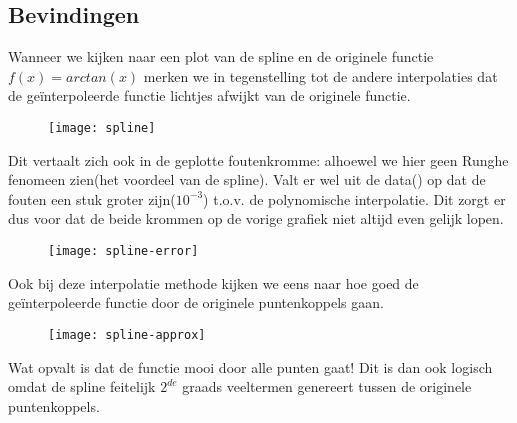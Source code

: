 \documentclass[10pt,a4paper,twocolumn]{article}
\begin{document}
\subsection{Bevindingen}
Wanneer we kijken naar een plot van de spline en de originele functie $f(x) = arctan(x)$ merken we in tegenstelling tot de andere interpolaties dat de geïnterpoleerde functie lichtjes afwijkt van de originele functie. 
\begin{figure}[H]
\texttt{[image: spline]}
\end{figure}
Dit vertaalt zich ook in de  geplotte foutenkromme: alhoewel we hier geen Runghe fenomeen zien(het voordeel van de spline). Valt er wel uit de data(\texttt{}) op dat de fouten een stuk groter zijn($10^{-3}$) t.o.v. de polynomische interpolatie. Dit zorgt er dus voor dat de beide krommen op de vorige grafiek niet altijd even gelijk lopen.
\begin{figure}[H]
\texttt{[image: spline-error]}
\end{figure}
Ook bij deze interpolatie methode kijken we eens naar hoe goed de geïnterpoleerde functie door de originele puntenkoppels gaan.
\begin{figure}[H]
\texttt{[image: spline-approx]}
\end{figure}
Wat opvalt is dat de functie mooi door alle punten gaat! Dit is dan ook logisch omdat de spline feitelijk $2^{de}$ graads veeltermen genereert tussen de originele puntenkoppels.
\end{document}
